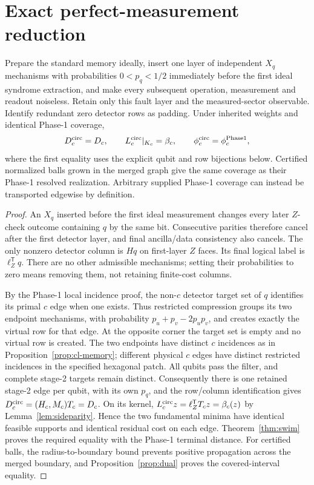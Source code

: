 \section{Exact perfect-measurement reduction}
\label{sec:cl-limit}
\begin{theorem}\label{thm:cl-limit}
Prepare the standard memory ideally, insert one layer of independent
$X_q$ mechanisms with probabilities $0<p_q<1/2$ immediately before the
first ideal syndrome extraction, and make every subsequent operation,
measurement and readout noiseless. Retain only this fault layer and the
measured-sector observable. Identify redundant zero detector rows as
padding. Under inherited weights and identical Phase-1 coverage,
\[
 D_c^{\rm circ}=D_c,\qquad L_c^{\rm circ}|_{K_c}=\beta_c,
 \qquad \phi_c^{\rm circ}=\phi_c^{\rm Phase1},
 \label{eq:cl-limit}
\]
where the first equality uses the explicit qubit and row bijections below.
Certified normalized balls grown in the merged graph give the same
coverage as their Phase-1 resolved realization. Arbitrary supplied
Phase-1 coverage can instead be transported edgewise by definition.
\end{theorem}
\begin{proof}
An $X_q$ inserted before the first ideal measurement changes every later
$Z$-check outcome containing $q$ by the same bit. Consecutive parities
therefore cancel after the first detector layer, and final ancilla/data
consistency also cancels. The only nonzero detector column is $Hq$ on
first-layer $Z$ faces. Its final logical label is $\ell_Z^{\mathsf T}q$.
There are no other admissible mechanisms; setting their probabilities
to zero means removing them, not retaining finite-cost columns.

By the Phase-1 local incidence proof, the non-$c$ detector target set
of $q$ identifies its primal $c$ edge when one exists. Thus restricted
compression groups its two endpoint mechanisms, with probability
$p_u+p_v-2p_up_v$, and creates exactly the virtual row for that edge.
At the opposite corner the target set is empty and no virtual row is
created. The two endpoints have distinct $c$ incidences as in
Proposition~\ref{prop:cl-memory}; different physical $c$ edges have
distinct restricted incidences in the specified hexagonal patch.
All qubits pass the filter, and complete stage-2 targets remain distinct.
Consequently there is one retained stage-2 edge per qubit, with its own
$p_q$, and the row/column identification gives
$D_c^{\rm circ}=(H_c,M_c)T_c=D_c$.
On its kernel, $L_c^{\rm circ}z=\ell_Z^{\mathsf T}T_cz=\beta_c(z)$ by
Lemma~\ref{lem:sideparity}. Hence the two fundamental minima have
identical feasible supports and identical residual cost on each edge.
Theorem~\ref{thm:swim} proves the required equality with the Phase-1
terminal distance. For certified balls, the radius-to-boundary bound
prevents positive propagation across the merged boundary, and
Proposition~\ref{prop:dual} proves the covered-interval equality.
\end{proof}
